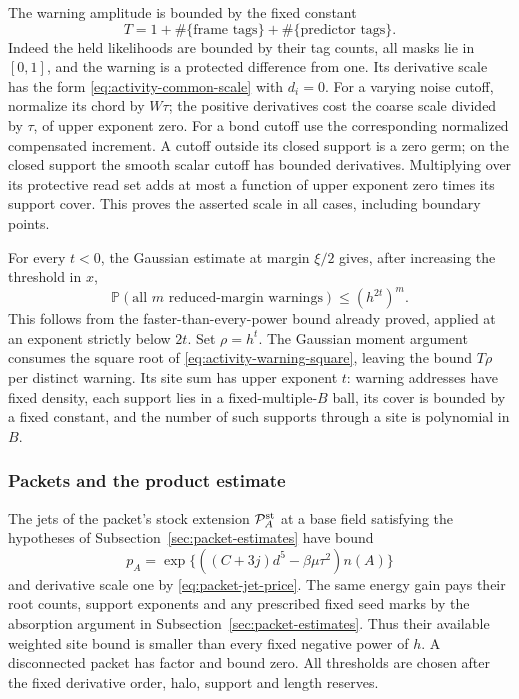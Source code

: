The warning amplitude is bounded by the fixed constant
\[
 T=1+\#\{\text{frame tags}\}+\#\{\text{predictor tags}\}.
\]
Indeed the held likelihoods are bounded by their tag counts,
all masks lie in $[0,1]$, and the warning is a protected
difference from one. Its derivative scale has the form
\eqref{eq:activity-common-scale} with $d_i=0$.
For a varying noise cutoff, normalize its chord by $W\tau$;
the positive derivatives cost the coarse scale divided by
$\tau$, of upper exponent zero. For a bond cutoff use the
corresponding normalized compensated increment. A cutoff
outside its closed support is a zero germ; on the closed support
the smooth scalar cutoff has bounded derivatives. Multiplying
over its protective read set adds at most a function of upper
exponent zero times its support cover. This proves the asserted
scale in all cases, including boundary points.

For every $t<0$, the Gaussian estimate at margin $\xi/2$ gives,
after increasing the threshold in $x$,
\begin{equation}\label{eq:activity-warning-square}
 \mathbb P(\text{all $m$ reduced-margin warnings})
       \le(h^{2t})^m.
\end{equation}
This follows from the faster-than-every-power bound already
proved, applied at an exponent strictly below $2t$.
Set $\rho=h^t$. The Gaussian moment argument consumes the
square root of \eqref{eq:activity-warning-square}, leaving
the bound $T\rho$ per distinct warning. Its site sum has upper
exponent $t$: warning addresses have fixed density, each support
lies in a fixed-multiple-$B$ ball, its cover is bounded by a fixed
constant, and the number of such supports through a site is
polynomial in $B$.

\subsubsection{Packets and the product estimate}
The jets of the packet's stock extension $\mathcal P_A^{\rm st}$ at a
base field satisfying the hypotheses of
Subsection~\ref{sec:packet-estimates} have bound
\[
 p_A=\exp\{((C+3j)d^5-\beta\mu\tau^2)n(A)\}
\]
and derivative scale one by \eqref{eq:packet-jet-price}.
The same energy gain pays their root counts, support exponents
and any prescribed fixed seed marks by the absorption argument
in Subsection~\ref{sec:packet-estimates}. Thus their available
weighted site bound is smaller than every fixed negative power
of $h$. A disconnected packet has factor and bound zero.
All thresholds are chosen after the fixed derivative order,
halo, support and length reserves.

